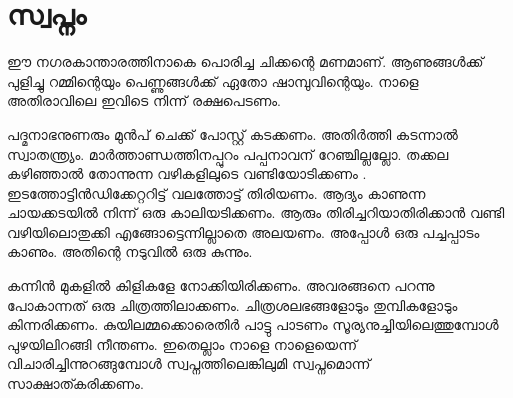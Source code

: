 \documentclass[10pt,a4paper]{report}
\begin{document}
%
%
%
%
\section{സ്വപ്നം }

 ഈ നഗരകാന്താരത്തിനാകെ പൊരിച്ച ചിക്കന്റെ മണമാണ്. ആണുങ്ങൾക്ക് പുളിച്ചു റമ്മിന്റെയും പെണ്ണുങ്ങൾക്ക് ഏതോ ഷാമ്പുവിന്റെയും. നാളെ അതിരാവിലെ ഇവിടെ നിന്ന് രക്ഷപെടണം.
 
  പദ്മനാഭനുണരും മുൻപ് ചെക്ക് പോസ്റ്റ് കടക്കണം. അതിർത്തി കടന്നാൽ സ്വാതന്ത്ര്യം. മാർത്താണ്ഡത്തിനപ്പുറം പപ്പനാവന് റേഞ്ചില്ലല്ലോ. തക്കല കഴിഞ്ഞാൽ തോന്നുന്ന വഴികളിലുടെ വണ്ടിയോടിക്കണം . ഇടത്തോട്ടിൻഡിക്കേറ്ററിട്ട് വലത്തോട്ട് തിരിയണം. ആദ്യം കാണുന്ന ചായക്കടയിൽ നിന്ന് ഒരു കാലിയടിക്കണം. ആരും തിരിച്ചറിയാതിരിക്കാൻ വണ്ടി വഴിയിലൊതുക്കി എങ്ങോട്ടെന്നില്ലാതെ അലയണം. അപ്പോൾ ഒരു പച്ചപ്പാടം കാണും. അതിന്റെ നടുവിൽ ഒരു കുന്നും. 
  
  കന്നിൻ മുകളിൽ കിളികളേ നോക്കിയിരിക്കണം. അവരങ്ങനെ പറന്നു പോകാന്നത് ഒരു ചിത്രത്തിലാക്കണം. ചിത്രശലഭങ്ങളോടും തുമ്പികളോടും കിന്നരിക്കണം. കുയിലമ്മക്കൊരെതിർ പാട്ടു പാടണം സൂര്യനുച്ചിയിലെത്തുമ്പോൾ പുഴയിലിറങ്ങി നീന്തണം. ഇതെല്ലാം നാളെ നാളെയെന്ന് വിചാരിച്ചിന്നുറങ്ങുമ്പോൾ സ്വപ്നത്തിലെങ്കിലുമി സ്വപ്നമൊന്ന് സാക്ഷാത്കരിക്കണം.
 
\end{document}
